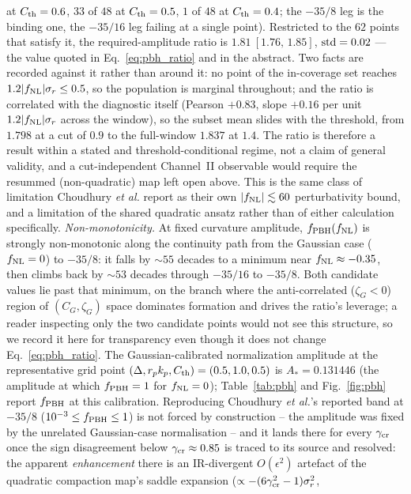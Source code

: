 \documentclass[aps,prd,twocolumn,superscriptaddress,nofootinbib,longbibliography]{revtex4-2}
\newcommand{\fnl}{f_{\rm NL}}
\newcommand{\fpbh}{f_{\rm PBH}}
\begin{document}
at $C_{\rm th}=0.6$, $33$ of $48$ at $C_{\rm th}=0.5$, $1$ of $48$ at $C_{\rm th}=0.4$; the
$-35/8$ leg is the binding one, the $-35/16$ leg failing at a single point). Restricted to the
$62$ points that satisfy it, the required-amplitude ratio is $1.81~[1.76,\,1.85]$,
${\rm std}=0.02$ --- the value quoted in Eq.~\eqref{eq:pbh_ratio} and in the abstract. Two facts
are recorded against it rather than around it: no point of the in-coverage set reaches
$1.2|\fnl|\sigma_r\le0.5$, so the population is marginal throughout; and the ratio is correlated
with the diagnostic itself (Pearson $+0.83$, slope $+0.16$ per unit $1.2|\fnl|\sigma_r$ across
the window), so the subset mean slides with the threshold, from $1.798$ at a cut of $0.9$ to the
full-window $1.837$ at $1.4$. The ratio is therefore a result within a stated and
threshold-conditional regime, not a claim of general validity, and a cut-independent Channel~II
observable would require the resummed (non-quadratic) map left open above. This is the same class
of limitation Choudhury \textit{et al.} report as their own $|\fnl|\lesssim60$ perturbativity
bound, and a limitation of the shared quadratic ansatz rather than of either calculation
specifically.
\emph{Non-monotonicity.} At fixed
curvature amplitude, $\fpbh(\fnl)$ is strongly non-monotonic along the
continuity path from the Gaussian case ($\fnl=0$) to $-35/8$: it falls by
$\sim55$ decades to a minimum near $\fnl\approx-0.35$, then climbs back by
$\sim53$ decades through $-35/16$ to $-35/8$. Both candidate values lie past
that minimum, on the branch where the anti-correlated ($\zeta_G<0$) region of
$(C_G,\zeta_G)$ space dominates formation and drives the ratio's leverage; a
reader inspecting only the two candidate points would not see this structure,
so we record it here for transparency even though it does not change
Eq.~\eqref{eq:pbh_ratio}. The Gaussian-calibrated normalization amplitude at
the representative grid point $(\Delta,r_pk_p,C_{\rm th})=(0.5,1.0,0.5)$ is
$A_*=0.131446$ (the amplitude at which $\fpbh=1$ for $\fnl=0$); Table~\ref{tab:pbh}
and Fig.~\ref{fig:pbh} report $\fpbh$ at this calibration. Reproducing
Choudhury \textit{et al.}'s reported band at $-35/8$
($10^{-3}\le\fpbh\le1$) is not forced by construction -- the amplitude was
fixed by the unrelated Gaussian-case normalisation -- and it lands there for
every $\gamma_{\rm cr}$ once the sign disagreement below $\gamma_{\rm
cr}\approx0.85$ is traced to its source and resolved: the apparent
\emph{enhancement} there is an IR-divergent $O(\epsilon^2)$ artefact of the
quadratic compaction map's saddle expansion ($\propto-(6\gamma_{\rm cr}^2-1)\sigma_r^2$,
\end{document}
